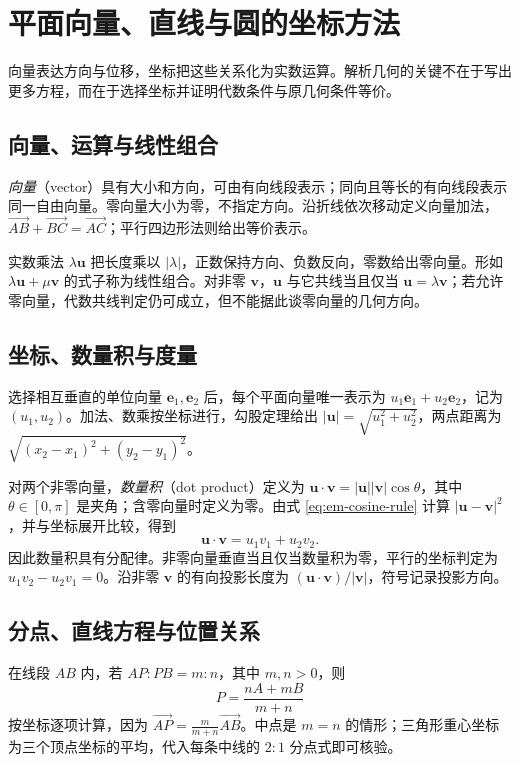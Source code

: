 \setcounter{chapter}{18} %
\chapter{平面向量、直线与圆的坐标方法}
\label{chap:em-vectors}
向量表达方向与位移，坐标把这些关系化为实数运算。解析几何的关键不在于写出更多方程，而在于选择坐标并证明代数条件与原几何条件等价。

\section{向量、运算与线性组合}
\emph{向量}（vector）具有大小和方向，可由有向线段表示；同向且等长的有向线段表示同一自由向量。零向量大小为零，不指定方向。沿折线依次移动定义向量加法，$\overrightarrow{AB}+\overrightarrow{BC}=\overrightarrow{AC}$；平行四边形法则给出等价表示。

实数乘法 $\lambda\boldsymbol u$ 把长度乘以 $|\lambda|$，正数保持方向、负数反向，零数给出零向量。形如 $\lambda\boldsymbol u+\mu\boldsymbol v$ 的式子称为线性组合。对非零 $\boldsymbol v$，$\boldsymbol u$ 与它共线当且仅当 $\boldsymbol u=\lambda\boldsymbol v$；若允许零向量，代数共线判定仍可成立，但不能据此谈零向量的几何方向。

\section{坐标、数量积与度量}
选择相互垂直的单位向量 $\boldsymbol e_1,\boldsymbol e_2$ 后，每个平面向量唯一表示为 $u_1\boldsymbol e_1+u_2\boldsymbol e_2$，记为 $(u_1,u_2)$。加法、数乘按坐标进行，勾股定理给出 $|\boldsymbol u|=\sqrt{u_1^2+u_2^2}$，两点距离为 $\sqrt{(x_2-x_1)^2+(y_2-y_1)^2}$。

对两个非零向量，\emph{数量积}（dot product）定义为 $\boldsymbol u\cdot\boldsymbol v=|\boldsymbol u||\boldsymbol v|\cos\theta$，其中 $\theta\in[0,\pi]$ 是夹角；含零向量时定义为零。由式 \eqref{eq:em-cosine-rule} 计算 $|\boldsymbol u-\boldsymbol v|^2$，并与坐标展开比较，得到
\[
 \boldsymbol u\cdot\boldsymbol v=u_1v_1+u_2v_2.
\]
因此数量积具有分配律。非零向量垂直当且仅当数量积为零，平行的坐标判定为 $u_1v_2-u_2v_1=0$。沿非零 $\boldsymbol v$ 的有向投影长度为 $(\boldsymbol u\cdot\boldsymbol v)/|\boldsymbol v|$，符号记录投影方向。

\section{分点、直线方程与位置关系}
在线段 $AB$ 内，若 $AP:PB=m:n$，其中 $m,n>0$，则
\[
 P=\frac{nA+mB}{m+n}
\]
按坐标逐项计算，因为 $\overrightarrow{AP}=\frac m{m+n}\overrightarrow{AB}$。中点是 $m=n$ 的情形；三角形重心坐标为三个顶点坐标的平均，代入每条中线的 $2:1$ 分点式即可核验。

